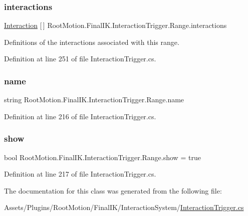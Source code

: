 \subsubsection{\texorpdfstring{interactions}{interactions}}
{\footnotesize\ttfamily \mbox{\hyperlink{class_root_motion_1_1_final_i_k_1_1_interaction_trigger_1_1_range_1_1_interaction}{Interaction}} \mbox{[}$\,$\mbox{]} Root\+Motion.\+Final\+I\+K.\+Interaction\+Trigger.\+Range.\+interactions}



Definitions of the interactions associated with this range. 



Definition at line 251 of file Interaction\+Trigger.\+cs.

\mbox{\label{class_root_motion_1_1_final_i_k_1_1_interaction_trigger_1_1_range_ab06390fdfcdbe007312d2b3932283b1f}} 
\subsubsection{\texorpdfstring{name}{name}}
{\footnotesize\ttfamily string Root\+Motion.\+Final\+I\+K.\+Interaction\+Trigger.\+Range.\+name}



Definition at line 216 of file Interaction\+Trigger.\+cs.

\mbox{\label{class_root_motion_1_1_final_i_k_1_1_interaction_trigger_1_1_range_a8e3b184785af6b622f9fa5a72cd52a40}} 
\subsubsection{\texorpdfstring{show}{show}}
{\footnotesize\ttfamily bool Root\+Motion.\+Final\+I\+K.\+Interaction\+Trigger.\+Range.\+show = true}



Definition at line 217 of file Interaction\+Trigger.\+cs.



The documentation for this class was generated from the following file\+:\begin{DoxyCompactItemize}
\item 
Assets/\+Plugins/\+Root\+Motion/\+Final\+I\+K/\+Interaction\+System/\mbox{\hyperlink{_interaction_trigger_8cs}{Interaction\+Trigger.\+cs}}\end{DoxyCompactItemize}
